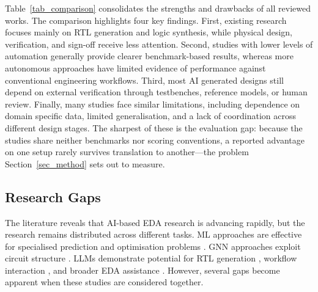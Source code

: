 \documentclass[conference]{IEEEtran}
\begin{document}
\noindent Table~\ref{tab_comparison} consolidates the strengths and drawbacks of all reviewed works. The comparison highlights four key findings. First, existing research focuses mainly on RTL generation and logic synthesis, while physical design, verification, and sign-off receive less attention. Second, studies with lower levels of automation generally provide clearer benchmark-based results, whereas more autonomous approaches have limited evidence of performance against conventional engineering workflows. Third, most AI generated designs still depend on external verification through testbenches, reference models, or human review. Finally, many studies face similar limitations, including dependence on domain specific data, limited generalisation, and a lack of coordination across different design stages. The sharpest of these is the evaluation gap: because the studies share neither benchmarks nor scoring conventions, a reported advantage on one setup rarely survives translation to another---the problem Section~\ref{sec_method} sets out to measure.

\subsection{
Research Gaps
}
\noindent The literature reveals that AI-based EDA research is advancing rapidly, but the research remains distributed across different tasks. ML approaches are effective for specialised prediction and optimisation problems \cite{P1_Huang2021,P2_Chen2023,P10_Fang2023,P8_Mirhoseini2021}. GNN approaches exploit circuit structure \cite{P3_Snchez2023}. LLMs demonstrate potential for RTL generation \cite{P4_Liu2025,P11_Thakur2024}, workflow interaction \cite{P5_Wu2024}, and broader EDA assistance \cite{P6_Pan2025,P7_He2025,P14_Liu2023ChipNeMo}. However, several gaps become apparent when these studies are considered together.\\
\end{document}
